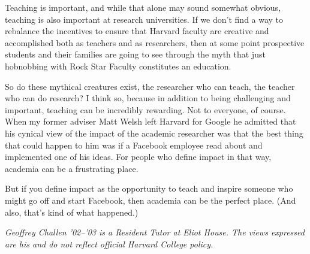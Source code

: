 Teaching is important, and while that alone may sound somewhat obvious,
teaching is also important at research universities. If we don't find a way
to rebalance the incentives to ensure that Harvard faculty are creative and
accomplished both as teachers and as researchers, then at some point
prospective students and their families are going to see through the myth
that just hobnobbing with Rock Star Faculty constitutes an education.

So do these mythical creatures exist, the researcher who can teach, the
teacher who can do research? I think so, because in addition to being
challenging and important, teaching can be incredibly rewarding. Not to
everyone, of course. When my former adviser Matt Welsh left Harvard for
Google he admitted that his cynical view of the impact of the academic
researcher was that the best thing that could happen to him was if a Facebook
employee read about and implemented one of his ideas. For people who define
impact in that way, academia can be a frustrating place.

But if you define impact as the opportunity to teach and inspire someone who
might go off and start Facebook, then academia can be the perfect place. (And
also, that's kind of what happened.)


\textit{Geoffrey Challen '02--'03 is a Resident Tutor at Eliot House. The
views expressed are his and do not reflect official Harvard College policy.}
